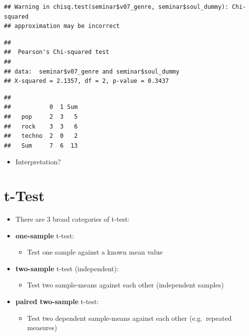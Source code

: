 \documentclass[
]{book}
\newenvironment{Shaded}{\begin{snugshade}}{\end{snugshade}}
\newcommand{\FunctionTok}[1]{\textcolor[rgb]{0.13,0.29,0.53}{\textbf{#1}}}
\newcommand{\NormalTok}[1]{#1}
\newcommand{\SpecialCharTok}[1]{\textcolor[rgb]{0.81,0.36,0.00}{\textbf{#1}}}
\providecommand{\tightlist}{%
  \setlength{\itemsep}{0pt}\setlength{\parskip}{0pt}}
\begin{document}
\begin{verbatim}
## Warning in chisq.test(seminar$v07_genre, seminar$soul_dummy): Chi-squared
## approximation may be incorrect
\end{verbatim}

\begin{verbatim}
## 
##  Pearson's Chi-squared test
## 
## data:  seminar$v07_genre and seminar$soul_dummy
## X-squared = 2.1357, df = 2, p-value = 0.3437
\end{verbatim}

\begin{Shaded}
\end{Shaded}

\begin{verbatim}
##         
##           0  1 Sum
##   pop     2  3   5
##   rock    3  3   6
##   techno  2  0   2
##   Sum     7  6  13
\end{verbatim}

\begin{itemize}
\tightlist
\item
  Interpretation?
\end{itemize}

\section{t-Test}\label{t-test}

\begin{itemize}
\item
  There are 3 broad categories of t-test:
\item
  \textbf{one-sample} t-test:

  \begin{itemize}
  \tightlist
  \item
    Test one sample against a known mean value
  \end{itemize}
\item
  \textbf{two-sample} t-test (independent):

  \begin{itemize}
  \tightlist
  \item
    Test two sample-means against each other (independent samples)
  \end{itemize}
\item
  \textbf{paired two-sample} t-test:

  \begin{itemize}
  \tightlist
  \item
    Test two dependent sample-means against each other (e.g.~repeated measures)
  \end{itemize}
\end{itemize}
\end{document}
